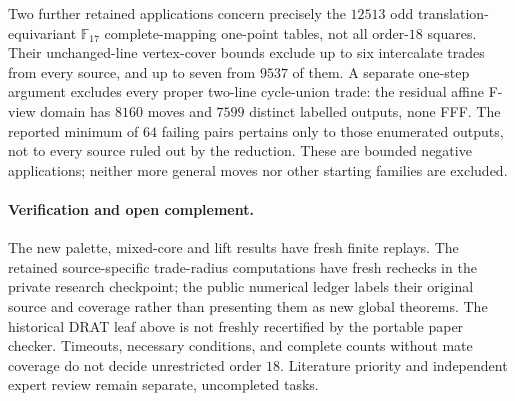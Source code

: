 Two further retained applications concern precisely the $12513$ odd
translation-equivariant $\mathbb F_{17}$ complete-mapping one-point
tables, not all order-$18$ squares. Their unchanged-line vertex-cover
bounds exclude up to six intercalate trades from every source, and
up to seven from $9537$ of them. A separate one-step argument excludes
every proper two-line cycle-union trade: the residual affine F-view
domain has $8160$ moves and $7599$ distinct labelled outputs, none FFF.
The reported minimum of $64$ failing pairs pertains only to those
enumerated outputs, not to every source ruled out by the reduction.
These are bounded negative applications; neither more general moves
nor other starting families are excluded.

\paragraph{Verification and open complement.}
The new palette, mixed-core and lift results have fresh finite replays.
The retained source-specific trade-radius computations have fresh
rechecks in the private research checkpoint; the public numerical
ledger labels their original source and coverage rather than presenting
them as new global theorems. The historical DRAT leaf above is not
freshly recertified by the portable paper checker. Timeouts, necessary
conditions, and complete counts without mate coverage do not decide
unrestricted order $18$. Literature priority and independent expert
review remain separate, uncompleted tasks.
